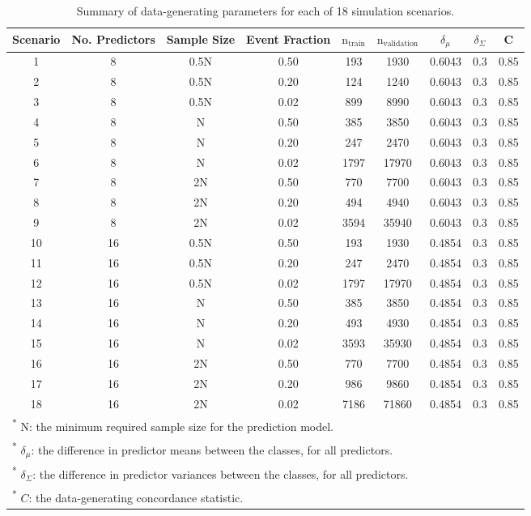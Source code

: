 \documentclass[AMA,STIX1COL,]{WileyNJD-v2}
\begin{document}
\begin{table}[!h]

\caption{\label{tab:sim_sets}Summary of data-generating parameters for each of 18 simulation scenarios.}
\centering
\begin{tabular}[t]{ccccccccc}
\toprule
Scenario & No. Predictors & Sample Size & Event Fraction & $\mathrm{n}_{\mathrm{train}}$ & $\mathrm{n}_{\mathrm{validation}}$ & $\delta_\mu$ & $\delta_\Sigma$ & C\\
\midrule
1 & 8 & 0.5N & 0.50 & 193 & 1930 & 0.6043 & 0.3 & 0.85\\
2 & 8 & 0.5N & 0.20 & 124 & 1240 & 0.6043 & 0.3 & 0.85\\
3 & 8 & 0.5N & 0.02 & 899 & 8990 & 0.6043 & 0.3 & 0.85\\
4 & 8 & N & 0.50 & 385 & 3850 & 0.6043 & 0.3 & 0.85\\
5 & 8 & N & 0.20 & 247 & 2470 & 0.6043 & 0.3 & 0.85\\
6 & 8 & N & 0.02 & 1797 & 17970 & 0.6043 & 0.3 & 0.85\\
7 & 8 & 2N & 0.50 & 770 & 7700 & 0.6043 & 0.3 & 0.85\\
8 & 8 & 2N & 0.20 & 494 & 4940 & 0.6043 & 0.3 & 0.85\\
9 & 8 & 2N & 0.02 & 3594 & 35940 & 0.6043 & 0.3 & 0.85\\
10 & 16 & 0.5N & 0.50 & 193 & 1930 & 0.4854 & 0.3 & 0.85\\
11 & 16 & 0.5N & 0.20 & 247 & 2470 & 0.4854 & 0.3 & 0.85\\
12 & 16 & 0.5N & 0.02 & 1797 & 17970 & 0.4854 & 0.3 & 0.85\\
13 & 16 & N & 0.50 & 385 & 3850 & 0.4854 & 0.3 & 0.85\\
14 & 16 & N & 0.20 & 493 & 4930 & 0.4854 & 0.3 & 0.85\\
15 & 16 & N & 0.02 & 3593 & 35930 & 0.4854 & 0.3 & 0.85\\
16 & 16 & 2N & 0.50 & 770 & 7700 & 0.4854 & 0.3 & 0.85\\
17 & 16 & 2N & 0.20 & 986 & 9860 & 0.4854 & 0.3 & 0.85\\
18 & 16 & 2N & 0.02 & 7186 & 71860 & 0.4854 & 0.3 & 0.85\\
\bottomrule
\multicolumn{9}{l}{\rule{0pt}{1em}\textsuperscript{*} N: the minimum required sample size for the prediction model.}\\
\multicolumn{9}{l}{\rule{0pt}{1em}\textsuperscript{*} $\delta_{\mu}$: the difference in predictor means between the classes, for all predictors.}\\
\multicolumn{9}{l}{\rule{0pt}{1em}\textsuperscript{*} $\delta_{\Sigma}$: the difference in predictor variances between the classes, for all predictors.}\\
\multicolumn{9}{l}{\rule{0pt}{1em}\textsuperscript{*} $C$: the data-generating concordance statistic.}\\
\end{tabular}
\end{table}
\end{document}
